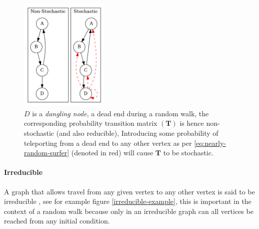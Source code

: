 \documentclass[11pt]{article}
\begin{document}
\begin{figure}
    \includegraphics[width=0.38\textwidth]{media/dot/stochastic_graph_example.dot.png}

    \caption{\label{fig:stochastic-example}\(D\) is a \emph{dangling node}, a dead end during a random walk, the corresponding probability transition matrix \((\mathbf{T})\) is hence non-stochastic (and also reducible), Introducing some probability of teleporting from a dead end to any other vertex as per \eqref{eq:nearly-random-surfer} (denoted in red) will cause \(\mathbf{T}\) to be stochastic.}
\end{figure}

\paragraph{Irreducible}
\label{sec:org578c303}
A graph that allows travel from any given vertex to any other vertex is said to be irreducible \cite{langvilleGooglePageRankScience2012}, see for example figure \ref{irreducible-example}, this is important in the context of a random walk because only in an irreducible graph can all vertices be reached from any initial condition.
\end{document}
